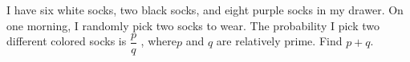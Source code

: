 I have six white socks, two black socks, and eight purple socks in my drawer. On one morning, I randomly pick two socks to wear. The probability I pick two different colored socks is $\dfrac{p}{q}$ , where$ p$ and $q$ are relatively prime. Find $p + q$.
